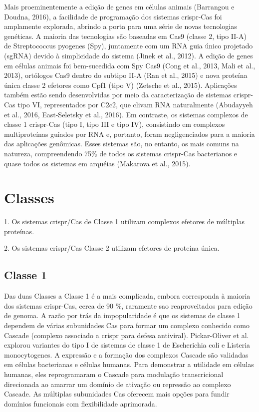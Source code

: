 \documentclass{report}
\begin{document}
Mais proeminentemente a edição de genes em células animais (Barrangou e Doudna, 2016), a facilidade de programação dos sistemas \ac{crispr}-Cas foi amplamente explorada, abrindo a porta para uma série de novas tecnologias genéticas. A maioria das tecnologias são baseadas em Cas9 (classe 2, tipo II-A) de Streptococcus pyogenes (Spy), juntamente com um RNA guia único projetado (sgRNA) devido à simplicidade do sistema (Jinek et al., 2012). A edição de genes em células animais foi bem-sucedida com Spy Cas9 (Cong et al., 2013, Mali et al., 2013), ortólogos Cas9 dentro do subtipo II-A (Ran et al., 2015) e nova proteína única classe 2 efetores como Cpf1 (tipo V) (Zetsche et al., 2015). Aplicações também estão sendo desenvolvidas por meio da caracterização de sistemas \ac{crispr}-Cas tipo VI, representados por C2c2, que clivam RNA naturalmente (Abudayyeh et al., 2016, East-Seletsky et al., 2016). Em contraste, os sistemas complexos de classe 1 \ac{crispr}-Cas (tipo I, tipo III e tipo IV), consistindo em complexos multiproteínas guiados por RNA e, portanto, foram negligenciados para a maioria das aplicações genômicas. Esses sistemas são, no entanto, os mais comuns na natureza, compreendendo 75\% de todos os sistemas \ac{crispr}-Cas bacterianos e quase todos os sistemas em arquéias (Makarova et al., 2015).
		

\section{Classes}
\setlength{\parindent}{3ex} \par



1. Os sistemas \ac{crispr}/Cas de Classe 1 utilizam complexos efetores de múltiplas proteínas. \par

2. Os sistemas \ac{crispr}/Cas Classe 2 utilizam efetores de proteína única.


\subsection{Classe 1}
\label{sec.util}

Das duas Classes a Classe 1 é a mais complicada, embora corresponda à maioria dos sistemas \ac{crispr}-Cas, cerca de 90 \%, raramente sao reaproveitados para edição de genoma. A razão por trás da impopularidade é que os sistemas de classe 1 dependem de várias subunidades Cas para formar um complexo conhecido como Cascade (complexo associado a \ac{crispr} para defesa antiviral). Pickar-Oliver et al. explorou variantes do tipo I de sistemas de classe 1 de Escherichia coli e Listeria monocytogenes. A expressão e a formação dos complexos Cascade são validadas em células bacterianas e células humanas. Para demonstrar a utilidade em células humanas, eles reprogramaram o Cascade para modulação transcricional direcionada ao amarrar um domínio de ativação ou repressão ao complexo Cascade. As múltiplas subunidades Cas oferecem mais opções para fundir domínios funcionais com flexibilidade aprimorada.\par
\end{document}
